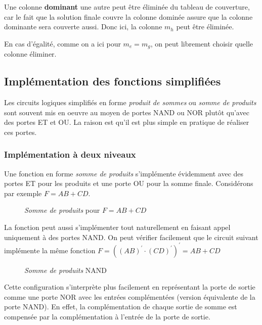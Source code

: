 \documentclass[11pt]{article}
\begin{document}
Une colonne \textbf{dominant} une autre peut être éliminée du tableau de
couverture, car le fait que la solution finale couvre la colonne
dominée assure que la colonne dominante sera couverte aussi. Donc ici,
la colonne \(m_h\) peut être éliminée.

En cas d'égalité, comme on a ici pour \(m_e = m_g\), on peut librement
choisir quelle colonne éliminer.

\subsection{Implémentation des fonctions simplifiées}
\label{sec:org59b94e5}

Les circuits logiques simplifiés en forme \emph{produit de sommes} ou
\emph{somme de produits} sont souvent mis en oeuvre au moyen de portes NAND
ou NOR plutôt qu'avec des portes ET et OU. La raison est qu'il est
plus simple en pratique de réaliser ces portes.

\subsubsection{Implémentation à deux niveaux}
\label{sec:org7dc9259}

Une fonction en forme \emph{somme de produits} s'implémente évidemment avec
des portes ET pour les produits et une porte OU pour la somme
finale. Considérons par exemple \(F = AB + CD\).

\begin{figure}[htbp]
\centering

\caption{\label{fig:org49354b3}\emph{Somme de produits} pour \(F = AB + CD\)}
\end{figure} 

La fonction peut aussi s'implémenter tout naturellement en faisant
appel uniquement à des portes NAND. On peut vérifier facilement que le
circuit suivant implémente la même fonction \(F = ((AB)^\prime \cdot
(CD)^\prime)^\prime = AB + CD\)

\begin{figure}[htbp]
\centering

\caption{\label{fig:orgb50d26a}\emph{Somme de produits} NAND}
\end{figure} 

Cette configuration s'interprète plus facilement en représentant la
porte de sortie comme une porte NOR avec les entrées complémentées
(version équivalente de la porte NAND). En effet, la complémentation
de chaque sortie de somme est compensée par la complémentation à
l'entrée de la porte de sortie.
\end{document}
